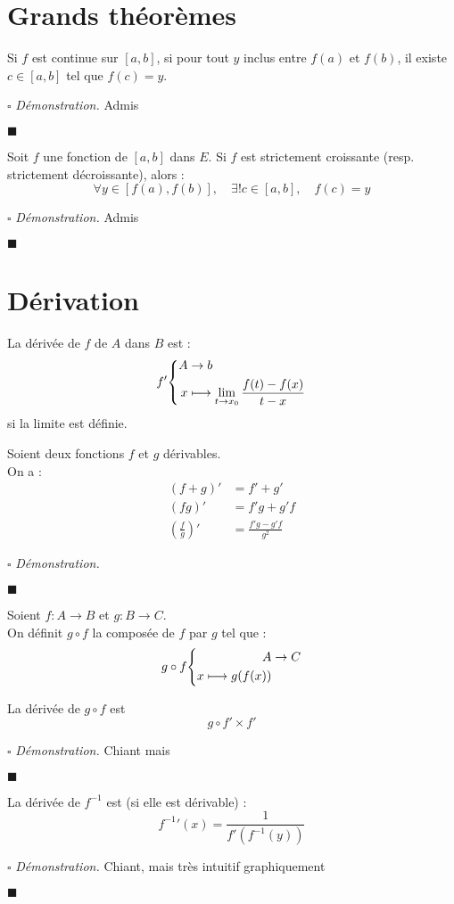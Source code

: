 \documentclass[a4paper, titlepage]{article}
\newenvironment{system}%
{\left\lbrace\begin{align}}%
{\end{align}\right.}
\renewenvironment{proof}{$\square$ \footnotesize\textit{Démonstration.}}{\begin{flushright}$\blacksquare$\end{flushright}}
\begin{document}
	\section{Grands théorèmes}
	\begin{thm}
		Si $f$ est continue sur $[a,b]$, si pour tout $y$ inclus entre $f(a)$ et $f(b)$, il existe $c\in[a,b]$ tel que $f(c)=y$.
	\end{thm}
	\begin{proof}
		Admis
	\end{proof}
	\begin{thm}
		Soit $f$ une fonction de $[a,b]$ dans $E$. Si $f$ est strictement croissante (resp. strictement décroissante), alors :
		$$ \forall y\in [f(a),f(b)],\quad\exists !c\in[a,b],\quad f(c)=y $$
	\end{thm}
	\begin{proof}
		Admis
	\end{proof}
	\section{Dérivation}
	\begin{defn}
		La dérivée de $f$ de $A$ dans $B$ est :
		$$f'\begin{system}
			A &\to b\\
			x&\longmapsto \lim_{t \to x_0} \frac{f(t)-f(x)}{t-x}
		\end{system}$$
		si la limite est définie.
	\end{defn}
	\begin{props}
		Soient deux fonctions $f$ et $g$ dérivables. \\
		On a :
		\begin{align*}
			(f+g)' &= f'+g'\\
			(fg)'  &= f'g+g'f \\
			\left(\frac{f}{g}\right)' &= \frac{f'g-g'f}{g^2} 
		\end{align*}
	\end{props}
	\begin{proof}
		\AQT
	\end{proof}
	\begin{defn}
		Soient $f:A\to B$ et $g:B\to C$.\\
		On définit $g\circ f$ la composée de $f$ par $g$ tel que :
		$$g\circ f\begin{system}
			A&\to C\\
			x\longmapsto g(f(x))
		\end{system}$$
	\end{defn}
	\begin{props}
		La dérivée de $g\circ f$ est $$g\circ f'\times f'$$
	\end{props}
	\begin{proof}
		Chiant mais \AQT
	\end{proof}
	\begin{thm}
		La dérivée de $f^{-1}$ est (si elle est dérivable) :
		$$ f^{-1}'(x)=\frac{1}{f'(f^{-1}(y))} $$
	\end{thm}
	\begin{proof}
		Chiant, mais très intuitif graphiquement
	\end{proof}
\end{document}
